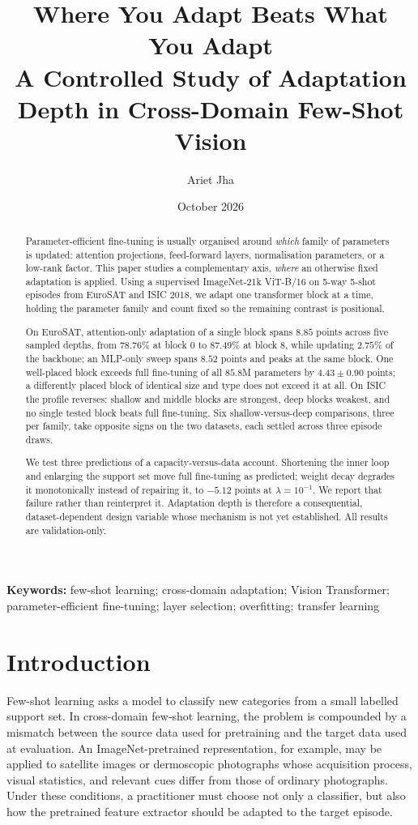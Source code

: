 \documentclass[11pt]{article}
\title{Where You Adapt Beats What You Adapt\\[0.25em]
\large A Controlled Study of Adaptation Depth in Cross-Domain Few-Shot Vision}
\author{Ariet Jha}
\date{October 2026}
\begin{document}
\maketitle

\begin{abstract}
Parameter-efficient fine-tuning is usually organised around \emph{which} family of
parameters is updated: attention projections, feed-forward layers, normalisation
parameters, or a low-rank factor. This paper studies a complementary axis,
\emph{where} an otherwise fixed adaptation is applied. Using a supervised
ImageNet-21k ViT-B/16 on 5-way 5-shot episodes from EuroSAT and ISIC 2018, we adapt
one transformer block at a time, holding the parameter family and count
fixed so the remaining contrast is positional.

On EuroSAT, attention-only adaptation of a single block spans $8.85$ points across
five sampled depths, from $78.76\%$ at block 0 to $87.49\%$ at block 8, while updating
$2.75\%$ of the backbone; an MLP-only sweep spans $8.52$ points and peaks at the same
block. One well-placed block exceeds full fine-tuning of all $85.8$M parameters by
$4.43\pm0.90$ points; a differently placed block of identical size and type does not
exceed it at all. On ISIC the profile reverses: shallow and middle blocks are
strongest, deep blocks weakest, and no single tested block beats full fine-tuning.
Six shallow-versus-deep comparisons, three per family, take opposite signs on
the two datasets, each settled across three episode draws.

We test three predictions of a capacity-versus-data account. Shortening the inner
loop and enlarging the support set move full fine-tuning as predicted; weight decay
degrades it monotonically instead of repairing it, to $-5.12$ points at
$\lambda=10^{-1}$. We report that failure rather than reinterpret it. Adaptation
depth is therefore a consequential, dataset-dependent design variable whose
mechanism is not yet established. All results are validation-only.
\end{abstract}

\noindent\textbf{Keywords:} few-shot learning; cross-domain adaptation; Vision Transformer; parameter-efficient fine-tuning; layer selection; overfitting; transfer learning

\section{Introduction}

Few-shot learning asks a model to classify new categories from a small labelled support set. In cross-domain few-shot learning, the problem is compounded by a mismatch between the source data used for pretraining and the target data used at evaluation. An ImageNet-pretrained representation, for example, may be applied to satellite images or dermoscopic photographs whose acquisition process, visual statistics, and relevant cues differ from those of ordinary photographs. Under these conditions, a practitioner must choose not only a classifier, but also how the pretrained feature extractor should be adapted to the target episode.
\end{document}
